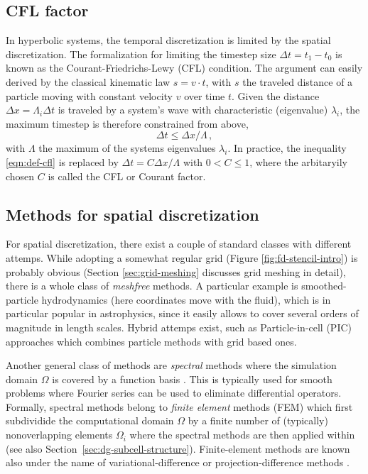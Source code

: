 
\subsection{CFL factor}
In hyperbolic systems, the temporal discretization is limited by the spatial
discretization. The formalization for limiting the timestep size
$\Delta t = t_1-t_0$ is known as the Courant-Friedrichs-Lewy (CFL) condition.
The argument can easily derived by the classical kinematic law
$s=v\cdot t$, with $s$ the traveled
distance of a particle moving with constant velocity $v$ over time $t$.
Given the distance $\Delta x = \Lambda_i \Delta t$ is traveled by a system's
wave with characteristic (eigenvalue) $\lambda_i$, the maximum timestep is
therefore constrained from above,
\begin{equation}\label{eqn:def-cfl}
\Delta t \leq \Delta x / \Lambda \,,
\end{equation}
with $\Lambda$ the maximum of the systems eigenvalues $\lambda_i$. In practice,
the inequality \eqref{eqn:def-cfl} is replaced by
$\Delta t = C \Delta x / \Lambda$ with $0 < C \leq 1$, where the arbitaryily
chosen $C$ is called the CFL or Courant factor.

\subsection{Methods for spatial discretization}
For spatial discretization, there exist a couple of standard classes with 
different attemps.
While adopting a somewhat regular grid (Figure \ref{fig:fd-stencil-intro}) is
probably obvious (Section \ref{sec:grid-meshing} discusses grid meshing in detail),
there is a whole class of \emph{meshfree} methods. A particular example is
smoothed-particle hydrodynamics (here coordinates move with the fluid), which is
in particular popular in astrophysics, since it easily allows to
cover several orders of magnitude in length scales. Hybrid attemps exist, such
as Particle-in-cell (PIC) approaches which combines particle methods with
grid based ones.

Another general class of methods are \emph{spectral} methods where the simulation
domain $\Omega$ is covered by a function basis \cite{hesthaven2007}.
This is typically used for smooth
problems where Fourier series can be used to eliminate differential operators.
Formally, spectral methods belong to \emph{finite element} methods (FEM) which first
subdividide the computational domain $\Omega$ by a finite number of (typically)
nonoverlapping elements $\Omega_i$ where the spectral methods are then applied
within (see also Section~\ref{sec:dg-subcell-structure}). 
Finite-element methods are
known also under the name of {variational-difference} or
{projection-difference} methods \cite{Ritz1909,Galerkin1915}.

